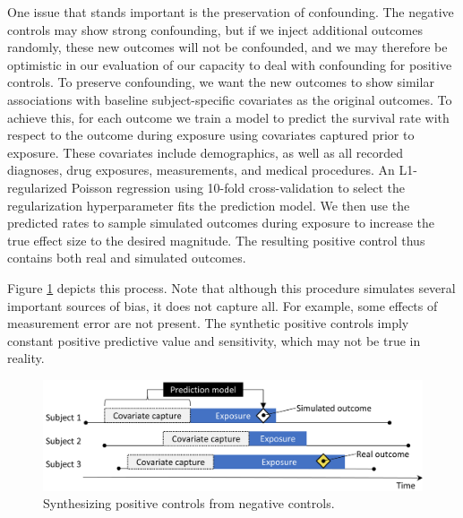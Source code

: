 \documentclass[11pt]{book}
\theoremstyle{definition}
\theoremstyle{definition}
\theoremstyle{definition}
\theoremstyle{remark}
\begin{document}
One issue that stands important is the preservation of confounding. The negative controls may show strong confounding, but if we inject additional outcomes randomly, these new outcomes will not be confounded, and we may therefore be optimistic in our evaluation of our capacity to deal with confounding for positive controls. To preserve confounding, we want the new outcomes to show similar associations with baseline subject-specific covariates as the original outcomes. To achieve this, for each outcome we train a model to predict the survival rate with respect to the outcome during exposure using covariates captured prior to exposure. These covariates include demographics, as well as all recorded diagnoses, drug exposures, measurements, and medical procedures. An L1-regularized Poisson regression \citep{suchard_2013} using 10-fold cross-validation to select the regularization hyperparameter fits the prediction model. We then use the predicted rates to sample simulated outcomes during exposure to increase the true effect size to the desired magnitude. The resulting positive control thus contains both real and simulated outcomes.

Figure \ref{fig:posControlSynth} depicts this process. Note that although this procedure simulates several important sources of bias, it does not capture all. For example, some effects of measurement error are not present. The synthetic positive controls imply constant positive predictive value and sensitivity, which may not be true in reality.

\begin{figure}

{\centering \includegraphics[width=0.9\linewidth]{images/MethodValidity/posControlSynth} 

}

\caption{Synthesizing positive controls from negative controls.}\label{fig:posControlSynth}
\end{figure}
\end{document}
